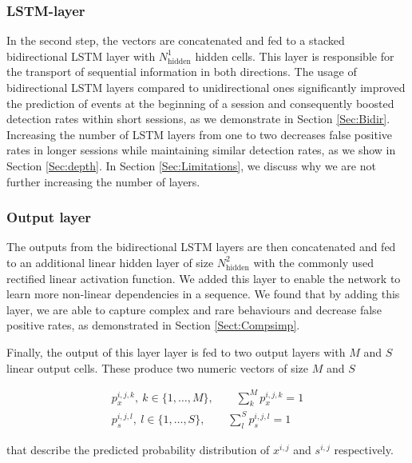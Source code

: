 \subsubsection{LSTM-layer}
In the second step, the vectors are concatenated and fed to a stacked bidirectional LSTM layer with $N^1_{\text{hidden}}$ hidden cells. This layer is responsible for the transport of sequential information in both directions. The usage of bidirectional LSTM layers compared to unidirectional ones significantly improved the prediction of events at the beginning of a session and consequently boosted detection rates within short sessions, as we demonstrate in Section \ref{Sec:Bidir}. Increasing the number of LSTM layers from one to two decreases false positive rates in longer sessions while maintaining similar detection rates, as we show in Section \ref{Sec:depth}. In Section \ref{Sec:Limitations}, we discuss why we are not further increasing the number of layers.


\subsubsection{Output layer}
The outputs from the bidirectional LSTM layers are then concatenated and fed to an additional linear hidden layer of size $N^2_{\text{hidden}}$ with the commonly used rectified linear activation function. We added this layer to enable the network to learn more non-linear dependencies in a sequence. 
We found that by adding this layer, we are able to capture complex and rare behaviours and decrease false positive rates, as demonstrated in Section \ref{Sect:Compsimp}.

Finally, the output of this layer layer is fed to two output layers with $M$ and $S$ linear output cells. These produce two numeric vectors of size $M$ and $S$

\begin{align*}
p_x^{i,j,k}, ~ k\in\{1,\dots,M\},~~~~~~~~~\sum_k^M p_x^{i,j,k}=1\\
p_s^{i,j,l}, ~ l\in\{1,\dots,S\},~~~~~~~~~\sum_l^S p_s^{i,j,l}=1
\end{align*}

\noindent that describe the predicted probability distribution of $x^{i,j}$ and $s^{i,j}$ respectively.



